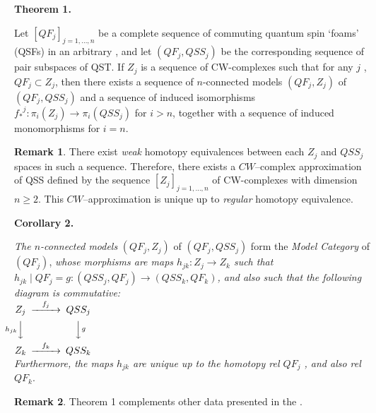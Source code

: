 \documentclass[12pt]{article}
\theoremstyle{plain}
\theoremstyle{definition}
\newtheorem{remark}{Remark}[section]
\numberwithin{equation}{section}
\newcommand{\med}{\medbreak}
\begin{document}
\textbf{Theorem 1.}

Let $[QF_j]_{j=1,...,n}$ be a complete sequence of commuting quantum spin `foams' 
(QSFs) in an arbitrary , and let $(QF_j,QSS_j)$ be the corresponding sequence of pair subspaces of QST. If $Z_j$ is a sequence of CW-complexes such that for any 
$j$ , $QF_j \subset Z_j$, then there exists a sequence of $n$-connected models $(QF_j,Z_j)$ of 
$(QF_j,QSS_j)$ and a sequence of induced isomorphisms  ${f_*}^j : \pi_i (Z_j)\rightarrow \pi_i (QSS_j)$ 
for $i>n$, together with a sequence of induced monomorphisms for $i=n$.
\med 

\begin{remark} 

 There exist \emph{weak} homotopy equivalences between each $Z_j$ and $QSS_j$ spaces 
in such a sequence. Therefore, there exists a $CW$--complex approximation of QSS defined by the sequence 
$[Z_j]_{j=1,...,n}$ of CW-complexes with dimension $n \geq 2$. This $CW$--approximation is 
unique up to \emph{regular} homotopy equivalence. 
\end{remark}

\textbf{Corollary 2.}

 \emph{The $n$-connected models} $(QF_j,Z_j)$ of $(QF_j,QSS_j)$ form the \emph{Model Category} of 
 $(QF_j)$,  \emph{whose  morphisms are maps $h_{jk}: Z_j \rightarrow Z_k$  such that $h_{jk}\mid QF_j = g: (QSS_j, QF_j) \rightarrow (QSS_k,QF_k)$, and also such that the following diagram is commutative:} \\
 
$
\begin{CD}
Z_j @> f_j  >> QSS_j
\\ @V h_{jk} VV   @VV g V
 \\ Z_k @ > f_k >> QSS_k 
\end{CD}
$
\\
\emph{Furthermore, the maps $h_{jk}$ are unique up to the homotopy rel $QF_j$ , and also rel $QF_k$}.

\begin{remark} 
{Theorem 1} complements other data presented in the .
\end{remark}

\end{document}
